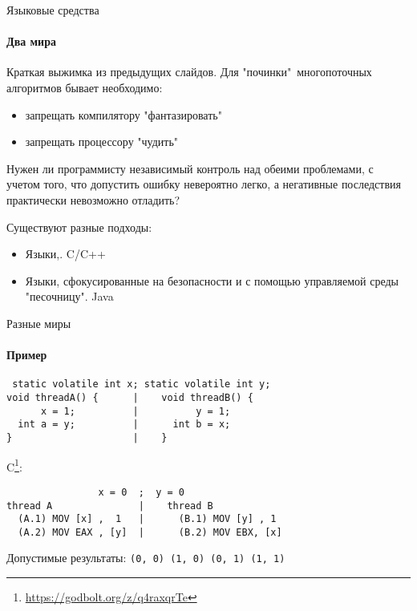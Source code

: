 \begin{frame}[t,noframenumbering]{Языковые средства}
\framesubtitle{Два мира}

Краткая выжимка из предыдущих слайдов. Для "починки"\ многопоточных алгоритмов бывает необходимо:
\begin{itemize}
  \item запрещать компилятору "фантазировать"
  \item запрещать процессору "чудить"
\end{itemize}

Нужен ли программисту независимый контроль над обеими проблемами, с учетом того, что допустить ошибку невероятно легко, а негативные последствия практически невозможно отладить?

Существуют разные подходы:
\begin{itemize}
  
  \item Языки,.
  C/C++

  \item Языки, сфокусированные на безопасности и с помощью управляемой среды "песочницу".
  Java
\end{itemize}

\end{frame}


\begin{frame}[fragile, t]{Разные миры}
\framesubtitle{Пример}

\begin{lstlisting}
 static volatile int x; static volatile int y;            
void threadA() {      |    void threadB() {                                   
      x = 1;          |          y = 1;                           
  int a = y;          |      int b = x;                           
}                     |    }                    
\end{lstlisting}

\pause
C\footnote<2->{\tiny\url{https://godbolt.org/z/q4raxqrTe}}:

\begin{lstlisting}
                x = 0  ;  y = 0
thread A               |    thread B          
  (A.1) MOV [x] ,  1   |      (B.1) MOV [y] , 1  
  (A.2) MOV EAX , [y]  |      (B.2) MOV EBX, [x] 
\end{lstlisting}

\pause
Допустимые результаты: \texttt{(0, 0) (1, 0) (0, 1) (1, 1)}
\end{frame}

